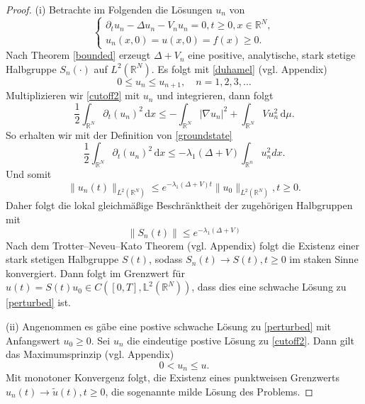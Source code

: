 \documentclass[11pt]{article}
\theoremstyle{break}
\begin{document}
\begin{proof}
(i) Betrachte im Folgenden die L\"osungen $u_n$ von
\begin{equation}\label{cutoff2}
\begin{cases}
\partial_t u_n - \Delta u_n - V_n u_n =0, t\ge 0, x\in \mathbb R^N,\\
u_n(x,0)=u(x,0)=f(x)\ge 0.
\end{cases}
\end{equation}
Nach Theorem \ref{bounded} erzeugt $\Delta + V_n$ eine positive, analytische, stark stetige Halbgruppe $S_n(\cdot)$ auf $L^2(\mathbb R^N)$. Es folgt mit \eqref{duhamel} (vgl. Appendix)
\begin{equation}\label{beh1}
0 \le u_n \le u_{n+1}, \quad n=1,2,3,\ldots
\end{equation}
Multiplizieren wir \eqref{cutoff2} mit $u_n$ und integrieren, dann folgt
\begin{equation}
\frac{1}{2} \int_{\mathbb R^N} \partial_t (u_n)^2\, \mathrm dx \le - \int_{\mathbb R^N} |\nabla u_n|^2 + \int_{\mathbb R^N} V u_n^2\, \mathrm d\mu.
\end{equation}
So erhalten wir mit der Definition von \eqref{groundstate}
\begin{equation}
\frac{1}{2} \int_{\mathbb R^N} \partial_t (u_n)^2\, \mathrm dx \le -\lambda_1(\Delta+V) \int_{\mathbb R^n} u_n^2 dx.
\end{equation}
Und somit
\begin{equation}
\|u_n(t)\|_{L^2(\mathbb R^N)} \le e^{-\lambda_1(\Delta +V) t} \|u_0\|_{L^2(\mathbb R^N)}, t\ge 0.
\end{equation}
Daher folgt die lokal gleichm\"a{\ss}ige Beschr\"anktheit der zugeh\"origen Halbgruppen mit
\begin{equation}
\|S_n(t)\| \le e^{-\lambda_1(\Delta + V)}
\end{equation}
Nach dem Trotter--Neveu--Kato Theorem (vgl. Appendix) folgt die Existenz einer stark stetigen Halbgruppe $S(t)$, sodass $S_n(t) \to S(t), t\ge 0$ im staken Sinne konvergiert.  Dann folgt im Grenzwert f\"ur $u(t) = S(t) u_0\in C([0,T],\mathbb L^2(\mathbb R^N))$, dass dies eine schwache L\"osung zu \eqref{perturbed} ist.  

(ii) Angenommen es g\"abe eine postive schwache L\"osung zu \eqref{perturbed} mit Anfangswert $u_0\ge 0$.  Sei $u_n$ die eindeutige postive L\"osung zu \eqref{cutoff2}. Dann gilt das Maximumsprinzip (vgl. Appendix)
\begin{equation}\label{maximum}
0<u_n \le u.
\end{equation}
Mit monotoner Konvergenz folgt, die Existenz eines punktweisen Grenzwerts $u_n(t)\to \tilde u(t), t\ge 0$, die sogenannte milde L\"osung des Problems.  


\end{proof}
\end{document}
